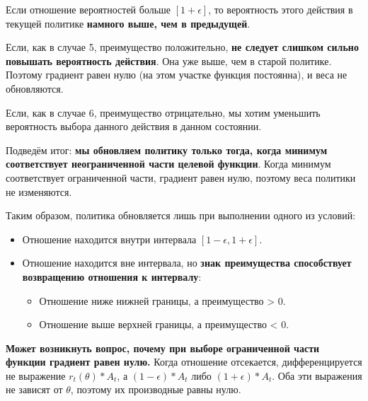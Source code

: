 \documentclass[11pt,a4paper]{article}
\begin{document}

Если отношение вероятностей больше \([1 + \epsilon]\), то вероятность этого действия в текущей политике \textbf{намного выше, чем в предыдущей}.

Если, как в случае 5, преимущество положительно, \textbf{не следует слишком сильно повышать вероятность действия}. Она уже выше, чем в старой политике. Поэтому градиент равен нулю (на этом участке функция постоянна), и веса не обновляются.

Если, как в случае 6, преимущество отрицательно, мы хотим уменьшить вероятность выбора данного действия в данном состоянии.

Подведём итог: \textbf{мы обновляем политику только тогда, когда минимум соответствует неограниченной части целевой функции}. Когда минимум соответствует ограниченной части, градиент равен нулю, поэтому веса политики не изменяются.

Таким образом, политика обновляется лишь при выполнении одного из условий:

\begin{itemize}
\tightlist
\item
  Отношение находится внутри интервала \([1 - \epsilon, 1 + \epsilon]\).
\item
  Отношение находится вне интервала, но \textbf{знак преимущества способствует возвращению отношения к интервалу}:

  \begin{itemize}
  \tightlist
  \item
    Отношение ниже нижней границы, а преимущество \textgreater{} 0.
  \item
    Отношение выше верхней границы, а преимущество \textless{} 0.
  \end{itemize}
\end{itemize}

\textbf{Может возникнуть вопрос, почему при выборе ограниченной части функции градиент равен нулю.} Когда отношение отсекается, дифференцируется не выражение \(r_t(\theta) * A_t\), а \((1 - \epsilon)* A_t\) либо \((1 + \epsilon)* A_t\). Оба эти выражения не зависят от \(\theta\), поэтому их производные равны нулю.
\end{document}

